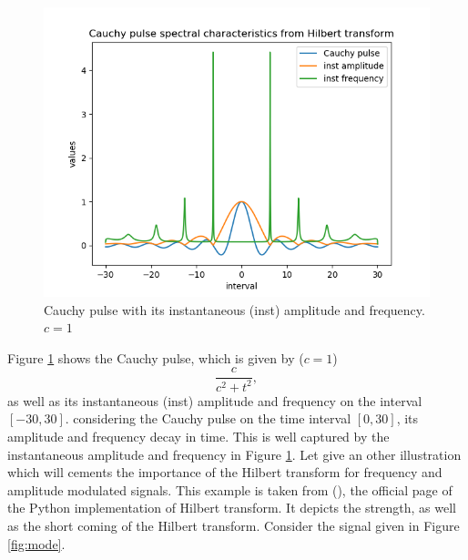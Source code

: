 \documentclass[../Main/thesis.tex]{subfiles}
\begin{document}
\begin{figure}[H]
	\centering
	\includegraphics[width=1\linewidth]{../fig/cauchy_pulse_spectral}
	\caption{Cauchy pulse with its instantaneous (inst) amplitude and frequency. $c=1$}
	\label{fig:cauchy_pulse}
\end{figure}
\justify
Figure \ref{fig:cauchy_pulse} shows the Cauchy pulse, which is given by ($c=1$)
\begin{equation}
	 \frac{c}{c^{2}+ t^{2}},
\end{equation}
as well as its instantaneous (inst) amplitude and frequency on the interval $[-30, 30]$. considering the Cauchy pulse on the time interval $[0,30]$, its amplitude and frequency decay in time. This is well captured by the instantaneous amplitude and frequency in Figure \ref{fig:cauchy_pulse}.
\justify
Let give an other illustration which will cements the importance of the Hilbert transform for frequency and amplitude modulated signals. This example is taken from (\cite{scipy2019}), the official page of the Python implementation of Hilbert transform. It depicts the strength, as well as the short coming of the Hilbert transform. Consider the signal given in Figure \ref{fig:mode}. 
\end{document}
